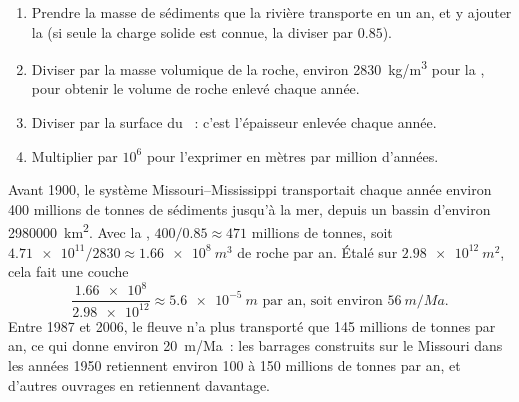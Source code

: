 \begin{method}\label{met:g12:destruction-of-mountains:budget}
\begin{enumerate}
  \item Prendre la masse de sédiments que la rivière transporte en un an,
        et y ajouter la  (si seule la charge solide est
        connue, la diviser par $0.85$).
  \item Diviser par la masse volumique de la roche, environ
        \qty{2830}{kg/m^3} pour la , pour obtenir le
        volume de roche enlevé chaque année.
  \item Diviser par la surface du ~: c'est l'épaisseur
        enlevée chaque année.
  \item Multiplier par $10^6$ pour l'exprimer en mètres par million
        d'années.
\end{enumerate}
\end{method}

\begin{example}[Le Mississippi]\label{ex:g12:destruction-of-mountains:mississippi}
Avant 1900, le système Missouri--Mississippi transportait chaque année
environ 400 millions de tonnes de sédiments jusqu'à la mer, depuis un
bassin d'environ \qty{2980000}{km^2}. Avec la ,
$400/0.85 \approx 471$ millions de tonnes, soit
$\num{4.71e11}/2830 \approx \qty{1.66e8}{m^3}$ de roche par an. Étalé sur
$\qty{2.98e12}{m^2}$, cela fait une couche
\[
  \frac{\num{1.66e8}}{\num{2.98e12}} \approx \qty{5.6e-5}{m}
  \text{ par an, soit environ } \qty{56}{m/Ma}.
\]
Entre 1987 et 2006, le fleuve n'a plus transporté que 145 millions de
tonnes par an, ce qui donne environ \qty{20}{m/Ma}~: les barrages
construits sur le Missouri dans les années 1950 retiennent environ 100 à
150 millions de tonnes par an, et d'autres ouvrages en retiennent davantage.
\end{example}


